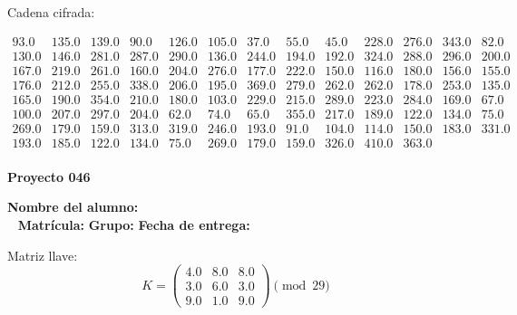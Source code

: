 \documentclass[12pt]{article}
\begin{document}
Cadena cifrada:
\begin{center}
$\begin{array}{lllllllllllll}
93.0 & 135.0 & 139.0 & 90.0 & 126.0 & 105.0 & 37.0 & 55.0 & 45.0 & 228.0 & 276.0 & 343.0 & 82.0\\
130.0 & 146.0 & 281.0 & 287.0 & 290.0 & 136.0 & 244.0 & 194.0 & 192.0 & 324.0 & 288.0 & 296.0 & 200.0\\
167.0 & 219.0 & 261.0 & 160.0 & 204.0 & 276.0 & 177.0 & 222.0 & 150.0 & 116.0 & 180.0 & 156.0 & 155.0\\
176.0 & 212.0 & 255.0 & 338.0 & 206.0 & 195.0 & 369.0 & 279.0 & 262.0 & 262.0 & 178.0 & 253.0 & 135.0\\
165.0 & 190.0 & 354.0 & 210.0 & 180.0 & 103.0 & 229.0 & 215.0 & 289.0 & 223.0 & 284.0 & 169.0 & 67.0\\
100.0 & 207.0 & 297.0 & 204.0 & 62.0 & 74.0 & 65.0 & 355.0 & 217.0 & 189.0 & 122.0 & 134.0 & 75.0\\
269.0 & 179.0 & 159.0 & 313.0 & 319.0 & 246.0 & 193.0 & 91.0 & 104.0 & 114.0 & 150.0 & 183.0 & 331.0\\
193.0 & 185.0 & 122.0 & 134.0 & 75.0 & 269.0 & 179.0 & 159.0 & 326.0 & 410.0 & 363.0\\
\end{array}$
\end{center}

\newpage


\textbf{Proyecto 046}

\textbf{Nombre del alumno:} \underline{\hspace{13cm}}\\\
\vspace{1cm}
\textbf{Matrícula:} \underline{\hspace{4cm}} \hspace{1cm}
\textbf{Grupo:} \underline{\hspace{2cm}}
\textbf{Fecha de entrega:} \underline{\hspace{2cm}}

\medskip

Matriz llave:
\[
K = \begin{pmatrix}
4.0 & 8.0 & 8.0\\
3.0 & 6.0 & 3.0\\
9.0 & 1.0 & 9.0
\end{pmatrix} \pmod{29}
\]
\end{document}
